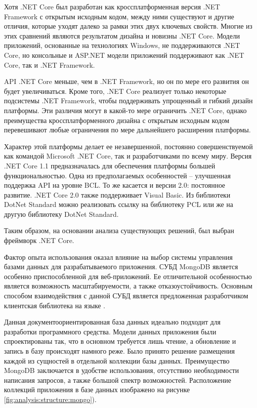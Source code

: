 Хотя .NET Core был разработан как кроссплатформенная версия .NET Framework с открытым исходным кодом, между ними существуют и другие отличия, которые уходят далеко за рамки этих двух ключевых свойств. Многие из этих сравнений являются результатом дизайна и новизны .NET Core. Модели приложений, основанные на технологиях Windows, не поддерживаются .NET Core, но консольные и ASP.NET модели приложений поддерживают как .NET Core, так и .NET Framework.

API .NET Core меньше, чем в .NET Framework, но он по мере его развития он будет увеличиваться. Кроме того, .NET Core реализует только некоторые подсистемы .NET Framework, чтобы поддерживать упрощенный и гибкий дизайн платформы. Эти различия могут в какой-то мере ограничить .NET Core, однако преимущества кроссплатформенного дизайна с открытым исходным кодом перевешивают любые ограничения по мере дальнейшего расширения платформы.

Характер этой платформы делает ее незавершенной, постоянно совершенствуемой как командой Microsoft .NET Core, так и разработчиками по всему миру. Версия .NET Core 1.1 предназначалась для обеспечения платформы большей функциональностью. Одна из предполагаемых особенностей – улучшенная поддержка API на уровне BCL. То же касается и версии 2.0: постоянное развитие. .NET Core 2.0 также поддерживает Visual Basic. Из библиотеки DotNet Standard можно реализовать ссылку на библиотеку PCL или же на другую библиотеку DotNet Standard.

Таким образом, на основании анализа существующих решений, был выбран фреймворк .NET Core.

Фактор опыта использования оказал влияние на выбор системы управления базами данных для разрабатываемого приложения. СУБД MongoDB является особенно приспособленной для веб-приложений. Ее отличительной особенностью является возможность масштабируемости, а также отказоустойчивость. Основным способом взаимодействия с данной СУБД является предложенная разработчиком клиентская библиотека на языке \csharp.

Данная документоориентированная база данных идеально подходит для разработки программного средства. Модели данных приложения были спроектированы так, что в основном требуется лишь чтение, а обновление и запись в базу происходят намного реже. Было принято решение размещения каждой из сущностей в отдельной коллекции базы данных. Преимущество MongoDB заключается в удобстве использования, отсутствию необходимости написания запросов, а также большой спектр возможностей. Расположение коллекций приложения в базе данных изображено на рисунке \ref{fig:analysis:structure:mongo}).

